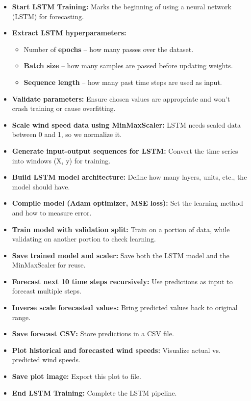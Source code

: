 \begin{itemize}
	\item \textbf{Start LSTM Training:} Marks the beginning of using a neural network (LSTM) for forecasting.
	\item \textbf{Extract LSTM hyperparameters:}
	\begin{itemize}
		\item Number of \textbf{epochs} – how many passes over the dataset.
		\item \textbf{Batch size} – how many samples are passed before updating weights.
		\item \textbf{Sequence length} – how many past time steps are used as input.
	\end{itemize}
	\item \textbf{Validate parameters:} Ensure chosen values are appropriate and won’t crash training or cause overfitting.
	\item \textbf{Scale wind speed data using MinMaxScaler:} LSTM needs scaled data between 0 and 1, so we normalize it.
	\item \textbf{Generate input-output sequences for LSTM:} Convert the time series into windows (X, y) for training.
	\item \textbf{Build LSTM model architecture:} Define how many layers, units, etc., the model should have.
	\item \textbf{Compile model (Adam optimizer, MSE loss):} Set the learning method and how to measure error.
	\item \textbf{Train model with validation split:} Train on a portion of data, while validating on another portion to check learning.
	\item \textbf{Save trained model and scaler:} Save both the LSTM model and the MinMaxScaler for reuse.
	\item \textbf{Forecast next 10 time steps recursively:} Use predictions as input to forecast multiple steps.
	\item \textbf{Inverse scale forecasted values:} Bring predicted values back to original range.
	\item \textbf{Save forecast CSV:} Store predictions in a CSV file.
	\item \textbf{Plot historical and forecasted wind speeds:} Visualize actual vs. predicted wind speeds.
	\item \textbf{Save plot image:} Export this plot to file.
	\item \textbf{End LSTM Training:} Complete the LSTM pipeline.
\end{itemize}

